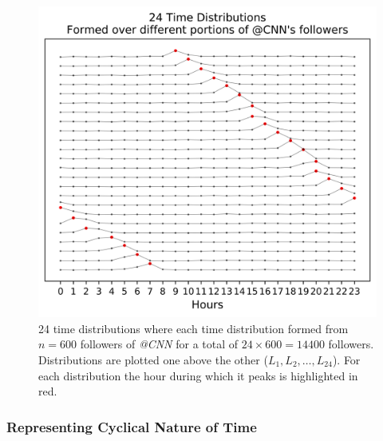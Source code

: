 \begin{figure}[!ht]
\centering
\includegraphics[width=5in]{Figures/Stackedcnn600.png}
\caption[Peak Analysis over Followers of @CNN]{24 time distributions where each time distribution formed from $n = 600$ followers of \emph{@CNN} for a total of $24 \times 600=14400$ followers. Distributions are plotted one above the other ($L_1, L_2, \ldots, L_{24}$). For each distribution the hour during which it peaks is highlighted in red. %
}
\label{fig_3N}
\end{figure}

\subsubsection{Representing Cyclical Nature of Time}

